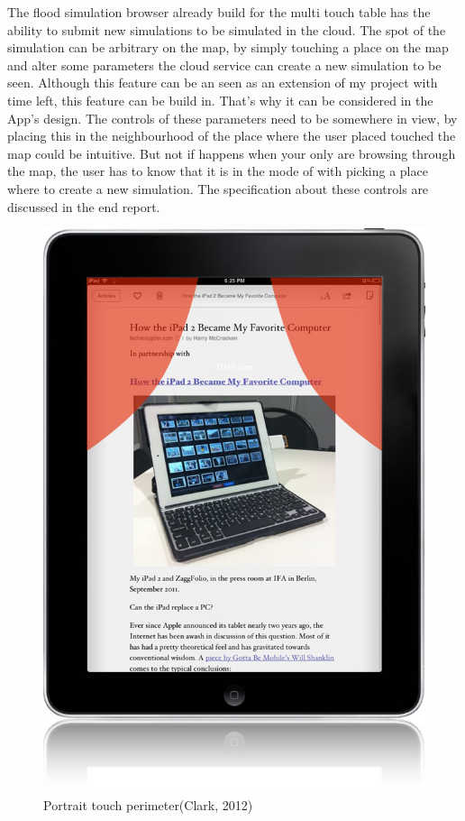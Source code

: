 \documentclass[10pt,a4paper]{article}
\begin{document}
The flood simulation browser already build for the multi touch table has the ability to submit new simulations to be simulated in the cloud. The spot of the simulation can be arbitrary on the map, by simply touching a place on the map and alter some parameters the cloud service can create a new simulation to be seen. Although this feature can be an seen as an extension of my project with time left, this feature can be build in. That's why it can be considered in the App's design. The controls of these parameters need to be somewhere in view, by placing this in the neighbourhood of the place where the user placed touched the map could be intuitive. But not if happens when your only are browsing through the map, the user has to know that it is in the mode of with picking a place where to create a new simulation. The specification about these controls are discussed in the end report.


\begin{figure}[h!]
\center
\includegraphics[scale=0.3]{touch.png}
\caption{Portrait touch perimeter(Clark, 2012)}
\label{fig:perimeter}
\end{figure}


\end{document}
